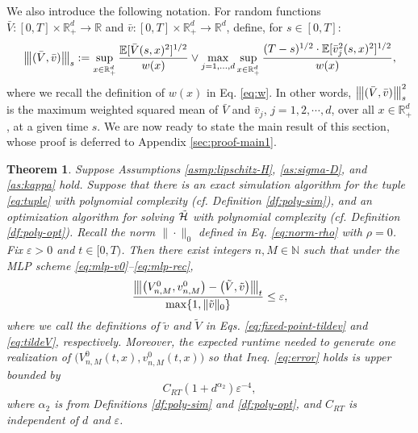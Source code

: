 \documentclass[11pt]{article}
\theoremstyle{definition}
\theoremstyle{plain}
\newtheorem{theorem}[assumption]{Theorem}
\newcommand{\R}{\mathbb{R}}
\newcommand{\N}{\mathbb{N}}
\newcommand{\cH}{{\cal H}}
\newcommand{\veps}{\varepsilon}
\newcommand{\vertiii}[1]{{\left\vert\kern-0.25ex\left\vert\kern-0.25ex\left\vert #1 
    \right\vert\kern-0.25ex\right\vert\kern-0.25ex\right\vert}}
\begin{document}
We also introduce the following notation. For random functions $\bar V : [0,T]\times \R_+^d \to \R$ and $\bar v : [0,T]\times \R_+^d \to \R^d$, 
define, for $s \in [0,T]$: 
\begin{equation}\label{eq:vertiii}
  \vertiii{(\bar V,\bar v)}_{s} := \sup_{x \in \mathbb{R}_+^d} 
  \frac{\mathbb{E}[ \bar V(s,x)^2 ]^{1/2}}{w(x)} \vee \max_{j=1,\dots,d} \sup_{x \in \mathbb{R}_+^d} 
  \frac{(T - s)^{1/2} \cdot \mathbb{E}[ \bar v_j^2(s,x)^2 ]^{1/2}}{w(x)}, 
\end{equation}
where we recall the definition of $w(x)$ in Eq. \eqref{eq:w}. 
In other words, $\vertiii{(\bar V,\bar v)}_{s}^2$ is the maximum weighted squared mean of $\bar V$ and $\bar v_j$, $j=1,2,\cdots,d$, over all $x \in \R_+^d$, 
at a given time $s$.
We are now ready to state the main result of this section, whose proof is deferred to Appendix \ref{sec:proof-main1}.
\begin{theorem}\label{thm:main1}
Suppose Assumptions \ref{asmp:lipschitz-H}, \ref{as:sigma-D}, and \ref{as:kappa} hold. 
Suppose that there is an exact simulation algorithm for the tuple \eqref{eq:tuple} with polynomial complexity (cf. Definition \ref{df:poly-sim}), 
and an optimization algorithm for solving $\tilde \cH$ with polynomial complexity (cf. Definition \ref{df:poly-opt}).
Recall the norm $\|\cdot\|_0$ defined in Eq. \eqref{eq:norm-rho} with $\rho = 0$.
Fix $\veps>0$ and $t \in [0,T)$. Then there exist integers $n, M \in \N$ such that under the MLP scheme \eqref{eq:mlp-v0}--\eqref{eq:mlp-rec}, 
\begin{equation}\label{eq:error}
  \frac{\vertiii{\left(V_{n,M}^{0}, v_{n,M}^{0}\right) - \left(\tilde V, \tilde{v}\right)}_{t}}{\max\{1, \|\tilde v\|_0\}} \leq \veps,
\end{equation}
where we call the definitions of $\tilde v$ and $\tilde V$ in Eqs. \eqref{eq:fixed-point-tildev} and \eqref{eq:tildeV}, respectively.
Moreover, the expected runtime needed to generate one realization of $\big(V^{0}_{n,M}(t,x), v^{0}_{n,M}(t,x)\big)$ so that Ineq. \eqref{eq:error} 
holds is upper bounded by
\begin{equation}\label{eq:sample-comp}
C_{RT} (1+d^{\alpha_2}) \veps^{-4},
\end{equation}
where $\alpha_2$ is from Definitions \ref{df:poly-sim} and \ref{df:poly-opt}, 
and $C_{RT}$ is independent of $d$ and $\veps$. 
\end{theorem}
\end{document}
